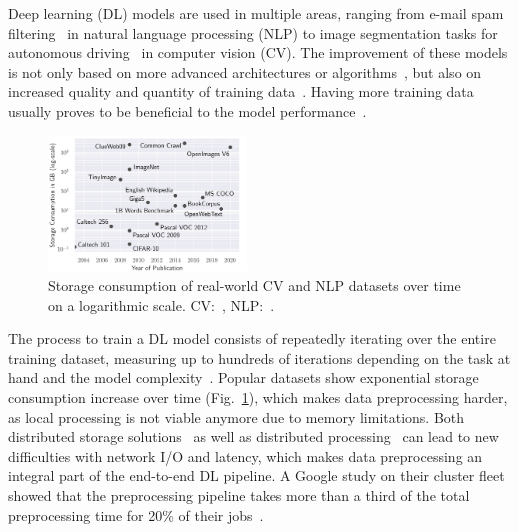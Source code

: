 Deep learning (DL) models are used in multiple areas, ranging from e-mail spam filtering~\cite{blanzieri2008survey} in natural language processing (NLP) to image segmentation tasks for autonomous driving~\cite{he2017mask} in computer vision (CV).
The improvement of these models is not only based on more advanced architectures or algorithms~\cite{vinyals2015show, szegedy2015going, lai2015simultaneous}, but also on increased quality and quantity of training data~\cite{Krizhevsky:2012:ICD:2999134.2999257,deng2009imagenet,lin2014microsoft,everingham2011pascal,szegedy2015going}.
Having more training data usually proves to be beneficial to the model performance~\cite{banko2001scaling}.

\vspace{-0.3cm}
\begin{figure}[h]
    \centering
    \includegraphics[width=0.47\textwidth]{figures/misc/all-datasets-size-cropped.png}
    \vspace{-0.3cm}
    \caption{Storage consumption of real-world CV and NLP datasets over time on a logarithmic scale. CV:~\cite{fei2004learning, griffin2007caltech, torralba200880, deng2009imagenet, pascal-voc-2009, everingham2011pascal, krizhevsky2009learning, lin2014microsoft, OpenImages2}, NLP:~\cite{callan2009clueweb09, giga5,chelba2013billion, engwiki, zhu2015aligning, commoncrawl, Gokaslan2019OpenWeb}.}
    \label{fig:all-datasets}
\end{figure}
\vspace{-0.2cm}

The process to train a DL model consists of repeatedly iterating over the entire training dataset, measuring up to hundreds of iterations depending on the task at hand and the model complexity~\cite{peters2018deep,he2016deep,szegedy2015rethinking,radford2018improving}.
Popular datasets show exponential storage consumption increase over time (Fig.~\ref{fig:all-datasets}), which makes data preprocessing harder, as local processing is not viable anymore due to memory limitations. Both distributed storage solutions~\cite{weil2006ceph} as well as distributed processing~\cite{gabriel2004open, vishnu2016distributed, beam,zaharia2010spark, 10.1145/3363554} can lead to new difficulties with network I/O and latency, which makes data preprocessing an integral part of the end-to-end DL pipeline.
A Google study on their cluster fleet showed that the preprocessing pipeline takes more than a third of the total preprocessing time for 20\% of their jobs~\cite{murray2021tf}.

